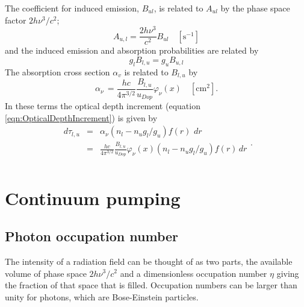 The coefficient for induced emission,
$B_{ul}$, is related to $A_{ul}$ by the phase
space factor $2h{\nu ^3}/{c^2}$;
\begin{equation}
{A_{u,l}} = \frac{{2h{\nu ^3}}}{{{c^2}}}{B_{ul}}
\quad [\mathrm{s}^{-1}]
\end{equation}
and the induced emission and absorption probabilities are related by
\begin{equation}
{g_l}{B_{l,u}} = {g_u}{B_{u,l}}
\end{equation}
The absorption cross section $\alpha _v$ is related to $B_{l,u}$ by
\begin{equation}
{\alpha _\nu }\, = \frac{{hc}}{{4{\pi
^{3/2}}}}\frac{{{B_{l,u}}}}{{{u_{Dop}}}}{\varphi _\nu }\left( x \right)
\quad [\mathrm{cm}^2].
\end{equation}
In these terms the optical depth increment
(equation \ref{eqn:OpticalDepthIncrement}) is given by
\begin{equation}
\begin{array}{ccl}
 d{\tau _{l,u}}& =& {\alpha _\nu }\left( {{n_l} - {n_u}{g_l}/{g_u}}
\right)f\left( r \right)\,\,dr \\
& =& \frac{{hc}}{{4{\pi ^{3/2}}}}\frac{{{B_{l,u}}}}{{{u_{Dop}}}}{\varphi
_\nu }\left( x \right)\left( {{n_l} - {n_u}{g_l}/{g_u}} \right)f\left( r
\right)\,dr \\
 \end{array}
 .
\end{equation}

\section{Continuum pumping}

\subsection{Photon occupation number}

The intensity of a radiation field can be thought of as two parts, the
available volume of phase space $2h{\nu ^3}/{c^2}$
and a dimensionless occupation number $\eta$ giving the fraction
of that space that is filled.
Occupation numbers can be larger than unity for
photons, which are Bose-Einstein particles.

